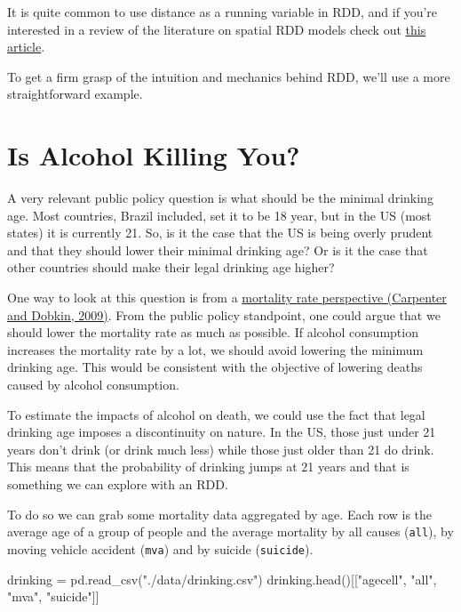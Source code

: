 \documentclass[
  letterpaper,
  DIV=11,
  numbers=noendperiod]{scrreprt}
\newenvironment{Shaded}{\begin{snugshade}}{\end{snugshade}}
\newcommand{\NormalTok}[1]{\textcolor[rgb]{0.00,0.23,0.31}{#1}}
\newcommand{\OperatorTok}[1]{\textcolor[rgb]{0.37,0.37,0.37}{#1}}
\newcommand{\StringTok}[1]{\textcolor[rgb]{0.13,0.47,0.30}{#1}}
\begin{document}
It is quite common to use distance as a running variable in RDD, and if
you're interested in a review of the literature on spatial RDD models
check out \href{https://www.jstor.org/stable/24572845}{this article}.

To get a firm grasp of the intuition and mechanics behind RDD, we'll use
a more straightforward example.

\hypertarget{is-alcohol-killing-you}{%
\section{Is Alcohol Killing You?}\label{is-alcohol-killing-you}}

A very relevant public policy question is what should be the minimal
drinking age. Most countries, Brazil included, set it to be 18 year, but
in the US (most states) it is currently 21. So, is it the case that the
US is being overly prudent and that they should lower their minimal
drinking age? Or is it the case that other countries should make their
legal drinking age higher?

One way to look at this question is from a
\href{https://www.aeaweb.org/articles?id=10.1257/app.1.1.164}{mortality
rate perspective (Carpenter and Dobkin, 2009)}. From the public policy
standpoint, one could argue that we should lower the mortality rate as
much as possible. If alcohol consumption increases the mortality rate by
a lot, we should avoid lowering the minimum drinking age. This would be
consistent with the objective of lowering deaths caused by alcohol
consumption.

To estimate the impacts of alcohol on death, we could use the fact that
legal drinking age imposes a discontinuity on nature. In the US, those
just under 21 years don't drink (or drink much less) while those just
older than 21 do drink. This means that the probability of drinking
jumps at 21 years and that is something we can explore with an RDD.

To do so we can grab some mortality data aggregated by age. Each row is
the average age of a group of people and the average mortality by all
causes (\texttt{all}), by moving vehicle accident (\texttt{mva}) and by
suicide (\texttt{suicide}).

\begin{Shaded}
\begin{Highlighting}[]
\NormalTok{drinking }\OperatorTok{=}\NormalTok{ pd.read\_csv(}\StringTok{"./data/drinking.csv"}\NormalTok{)}
\NormalTok{drinking.head()[[}\StringTok{"agecell"}\NormalTok{, }\StringTok{"all"}\NormalTok{, }\StringTok{"mva"}\NormalTok{, }\StringTok{"suicide"}\NormalTok{]]}
\end{Highlighting}
\end{Shaded}
\end{document}
